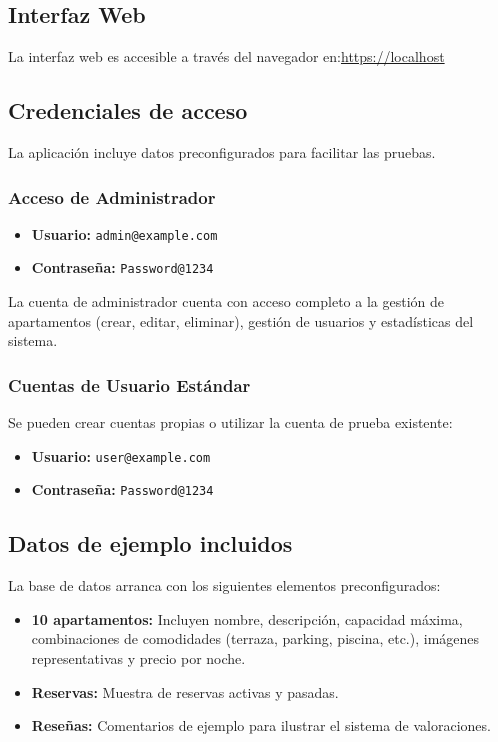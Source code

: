 \subsection{Interfaz Web}
La interfaz web es accesible a través del navegador en:\newline \url{https://localhost}

\subsection{Credenciales de acceso}
La aplicación incluye datos preconfigurados para facilitar las pruebas.

\subsubsection*{Acceso de Administrador}
\begin{itemize}
    \item \textbf{Usuario:} \texttt{admin@example.com}
    \item \textbf{Contraseña:} \texttt{Password@1234}
\end{itemize}
La cuenta de administrador cuenta con acceso completo a la gestión de apartamentos (crear, editar, eliminar), gestión de usuarios y estadísticas del sistema.

\subsubsection*{Cuentas de Usuario Estándar}
Se pueden crear cuentas propias o utilizar la cuenta de prueba existente:
\begin{itemize}
    \item \textbf{Usuario:} \texttt{user@example.com}
    \item \textbf{Contraseña:} \texttt{Password@1234}
\end{itemize}

\subsection{Datos de ejemplo incluidos}
La base de datos arranca con los siguientes elementos preconfigurados:
\begin{itemize}
    \item \textbf{10 apartamentos:} Incluyen nombre, descripción, capacidad máxima, combinaciones de comodidades (terraza, parking, piscina, etc.), imágenes representativas y precio por noche.
    \item \textbf{Reservas:} Muestra de reservas activas y pasadas.
    \item \textbf{Reseñas:} Comentarios de ejemplo para ilustrar el sistema de valoraciones.
\end{itemize}

